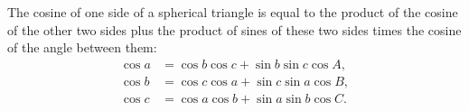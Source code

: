 \begin{tcolorbox}[title={Spherical Law of Cosines for Sides}]
    \begin{question}
        The cosine of one side of a spherical triangle is equal to the product of the cosine of the other two sides plus the product of sines of these two sides times the cosine of the angle between them:
        \begin{align*}
            \cos a &= \cos b \cos c + \sin b \sin c \cos A,\\
            \cos b &= \cos c \cos a + \sin c \sin a \cos B,\\
            \cos c &= \cos a \cos b + \sin a \sin b \cos C.
        \end{align*}
    \end{question}
\end{tcolorbox}


